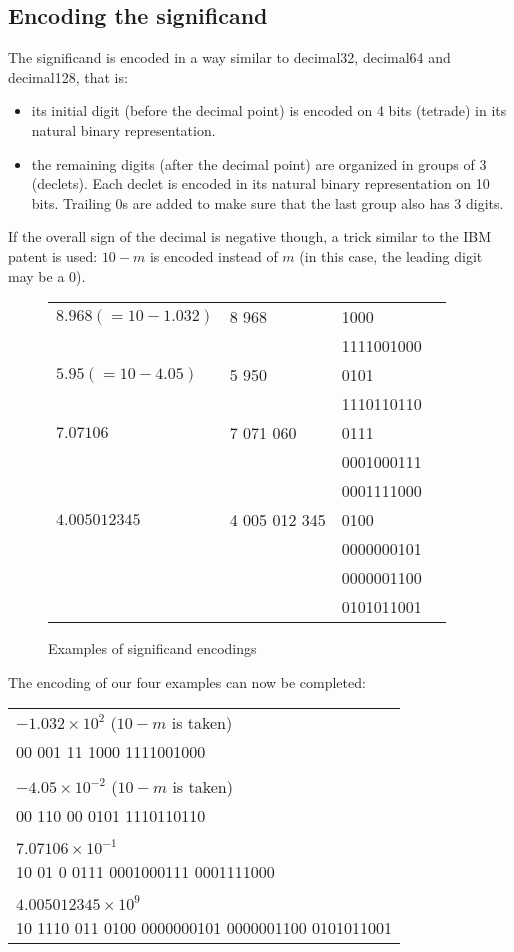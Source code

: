 \documentclass{acm_proc_article-sp}
\begin{document}
\subsection{Encoding the significand}

The significand is encoded in a way similar to decimal32, decimal64 and decimal128, that is:

\begin{itemize}
\item its initial digit (before the decimal point) is encoded on 4 bits (tetrade) in its natural binary representation.
\item the remaining digits (after the decimal point) are organized in groups of 3 (declets). Each declet is encoded in its natural binary representation on 10 bits. Trailing 0s are added to make sure that the last group also has 3 digits.
\end{itemize}

If the overall sign of the decimal is negative though, a trick similar to the IBM patent is used: $10-m$ is encoded instead of $m$ (in this case, the leading digit may be a 0).

\begin{figure}
\caption{Examples of significand encodings}
\label{figure-significand-encoding}
\center
\begin{tabular}{|l|l|l|l}
\hline
$8.968 (=10-1.032)$ & 8 968 & 1000 \\
& & 1111001000 \\
\hline
$5.95 (=10-4.05)$ & 5 950 & 0101 \\
& & 1110110110\\
\hline
$7.07106$ & 7 071 060 & 0111 \\
& & 0001000111\\
& & 0001111000\\
\hline
$4.005012345$ & 4 005 012 345 & 0100 \\
& & 0000000101\\
& & 0000001100\\
& & 0101011001\\
\hline
\end{tabular}
\end{figure}

The encoding of our four examples can now be completed:

\begin{tabular}{l}
$- 1.032 \times 10^2$ ($10-m$ is taken)\\
00 001 11 1000 1111001000\\
\\
$-4.05 \times 10^{-2}$ ($10-m$ is taken)\\
00 110 00 0101 1110110110\\
\\
$7.07106 \times 10^{-1}$\\
10 01 0 0111 0001000111 0001111000\\
\\
$4.005012345 \times 10^9$\\
10 1110 011 0100 0000000101 0000001100 0101011001\\
\end{tabular}
\end{document}
